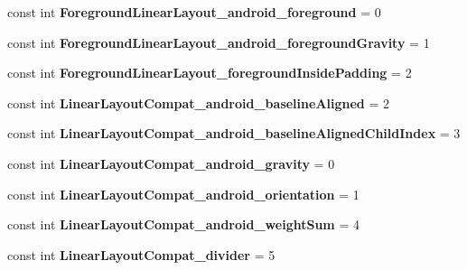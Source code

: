 \begin{DoxyCompactItemize}
\mbox{\label{classXaria_1_1Resource_1_1Styleable_ad29794fa45716ebc3f44e7cf4125e728}} 
const int {\bfseries Foreground\+Linear\+Layout\+\_\+android\+\_\+foreground} = 0
\item 
\mbox{\label{classXaria_1_1Resource_1_1Styleable_aaa07ac88d83233ab232164fc5f0d8ba4}} 
const int {\bfseries Foreground\+Linear\+Layout\+\_\+android\+\_\+foreground\+Gravity} = 1
\item 
\mbox{\label{classXaria_1_1Resource_1_1Styleable_a39dcaa1689c339d862be28ae1b6f3832}} 
const int {\bfseries Foreground\+Linear\+Layout\+\_\+foreground\+Inside\+Padding} = 2
\item 
\mbox{\label{classXaria_1_1Resource_1_1Styleable_a3c3cad7798ee91c454782a841831231c}} 
const int {\bfseries Linear\+Layout\+Compat\+\_\+android\+\_\+baseline\+Aligned} = 2
\item 
\mbox{\label{classXaria_1_1Resource_1_1Styleable_ad37a6ad7f017006ca7b31a7e9ed558aa}} 
const int {\bfseries Linear\+Layout\+Compat\+\_\+android\+\_\+baseline\+Aligned\+Child\+Index} = 3
\item 
\mbox{\label{classXaria_1_1Resource_1_1Styleable_afdd2e1e557d45d483430e5d71fe17b69}} 
const int {\bfseries Linear\+Layout\+Compat\+\_\+android\+\_\+gravity} = 0
\item 
\mbox{\label{classXaria_1_1Resource_1_1Styleable_a3009ea51590146a93aa66c5cf9a78e4e}} 
const int {\bfseries Linear\+Layout\+Compat\+\_\+android\+\_\+orientation} = 1
\item 
\mbox{\label{classXaria_1_1Resource_1_1Styleable_ad0b8433e8235f5d300290224055c58b3}} 
const int {\bfseries Linear\+Layout\+Compat\+\_\+android\+\_\+weight\+Sum} = 4
\item 
\mbox{\label{classXaria_1_1Resource_1_1Styleable_a85fb42fe2902831f9b2e986e875bbea2}} 
const int {\bfseries Linear\+Layout\+Compat\+\_\+divider} = 5

\end{DoxyCompactItemize}
